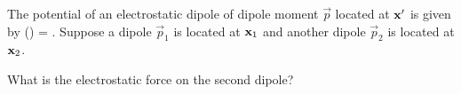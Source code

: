 \newcommand{\vp}{\vec{p}}
\newcommand{\vpq}{\vp_1}
\newcommand{\vpw}{\vp_2}
\newcommand{\vxq}{\vx_1}
\newcommand{\vxw}{\vx_2}
\newcommand{\Qq}{Q_1}
\newcommand{\Qw}{Q_2}
\newcommand{\phiq}{\phi_1}
\newcommand{\phiw}{\phi_2}
\newcommand{\vdq}{\vec{d}_1}
\newcommand{\vdw}{\vec{d}_2}
\newcommand{\vF}{\vec{F}}
\newcommand{\vEo}{\vE_0}

\newcommand{\rhow}{\rho_2}
\newcommand{\vEq}{\vE_1}
\newcommand{\pq}{p_1}
\newcommand{\pw}{p_2}


\begin{statement}{}
	The potential of an electrostatic dipole of dipole moment $\vp$ located at $\mathbf{x}'$ is given by
	\beqn \label{pot1}
		\phi(\vx) = \frac{\vp \cdot (\vx - \vx')}{|\vx - \vx'|^3}.
	\eeqn
	Suppose a dipole $\vpq$ is located at $\vxq$ and another dipole $\vpw$ is located at $\vxw$.
\end{statement}

\begin{problem} \label{3a}
	What is the electrostatic force on the second dipole?
\end{problem}

